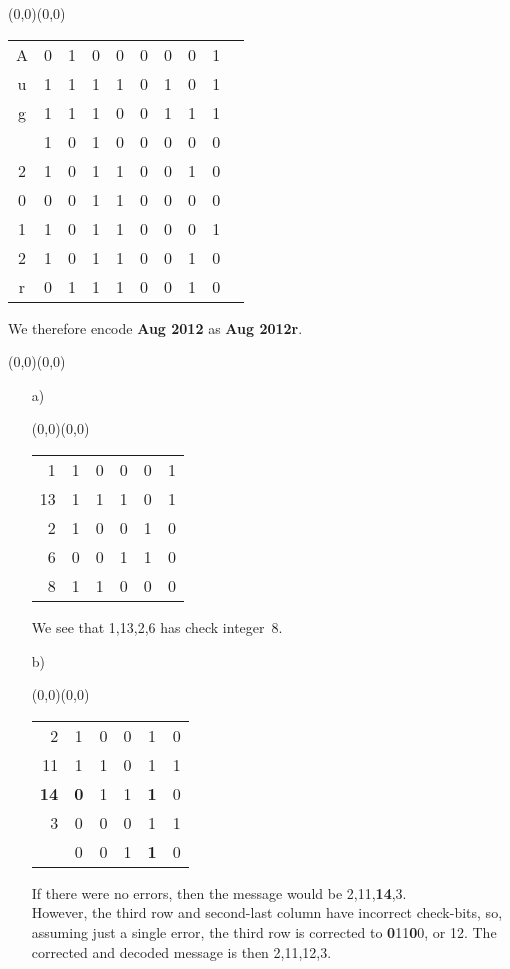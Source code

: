 \documentclass[11pt]{article}
\newcommand{\moveup}{\begin{picture}(0,0)(0,0)\end{picture}\vspace*{-8.15mm}}
\begin{document}
\bigskip
{} \moveup
\begin{center}
  \begin{tabular}{cc|cccccccc}
    A & 0 & 1 & 0 & 0 & 0 & 0 & 0 & 1\\
    u & 1 & 1 & 1 & 1 & 0 & 1 & 0 & 1\\
    g & 1 & 1 & 1 & 0 & 0 & 1 & 1 & 1\\
      & 1 & 0 & 1 & 0 & 0 & 0 & 0 & 0\\
    2 & 1 & 0 & 1 & 1 & 0 & 0 & 1 & 0\\
    0 & 0 & 0 & 1 & 1 & 0 & 0 & 0 & 0\\
    1 & 1 & 0 & 1 & 1 & 0 & 0 & 0 & 1\\
    2 & 1 & 0 & 1 & 1 & 0 & 0 & 1 & 0\\\hline
    r & 0 & 1 & 1 & 1 & 0 & 0 & 1 & 0
  \end{tabular}
\end{center}
We therefore encode {\bf Aug 2012} as {\bf Aug 2012r}.

\newpage
{} \moveup
\begin{itemize}
  \item[{a)}] \moveup
    \begin{center}
      \begin{tabular}{rc|cccc}
          1 & 1 & 0 & 0 & 0 & 1\\
         13 & 1 & 1 & 1 & 0 & 1\\
          2 & 1 & 0 & 0 & 1 & 0\\
          6 & 0 & 0 & 1 & 1 & 0\\\hline
          8 & 1 & 1 & 0 & 0 & 0\\
      \end{tabular}
    \end{center}
    We see that 1,13,2,6 has check integer~8.
  \item[{b)}] \moveup
    \begin{center}
      \begin{tabular}{rc|cccc}
           2 &    1 & 0 & 0 &    1 & 0\\
          11 &    1 & 1 & 0 &    1 & 1\\
      {\bf14}&{\bf0}& 1 & 1 &{\bf1}& 0\\
           3 &    0 & 0 & 0 &    1 & 1\\\hline
             &    0 & 0 & 1 &{\bf1}& 0\\
      \end{tabular}
    \end{center}
    If there were no errors, then the message would be 2,11,{\bf 14},3.\\
    However, the third row and second-last column have incorrect check-bits,
    so, assuming just a single error, the third row is corrected to {\bf0}11{\bf0}0, or 12.
    The corrected and decoded message is then 2,11,12,3.
\end{itemize}
\end{document}
